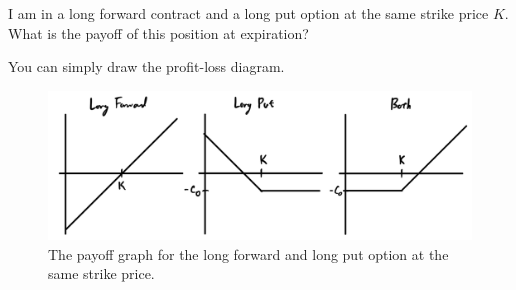 \documentclass{article}
\begin{document}
  \begin{exercise}[Hull 1.22]
    I am in a long forward contract and a long put option at the same strike price $K$. What is the payoff of this position at expiration?
  \end{exercise}
  \begin{solution}
    You can simply draw the profit-loss diagram. 
    \begin{figure}[H]
      \centering 
      \includegraphics[scale=0.2]{img/ex1-22.png}
      \caption{The payoff graph for the long forward and long put option at the same strike price.} 
      \label{fig:ex1-22}
    \end{figure}
  \end{solution}
\end{document}
